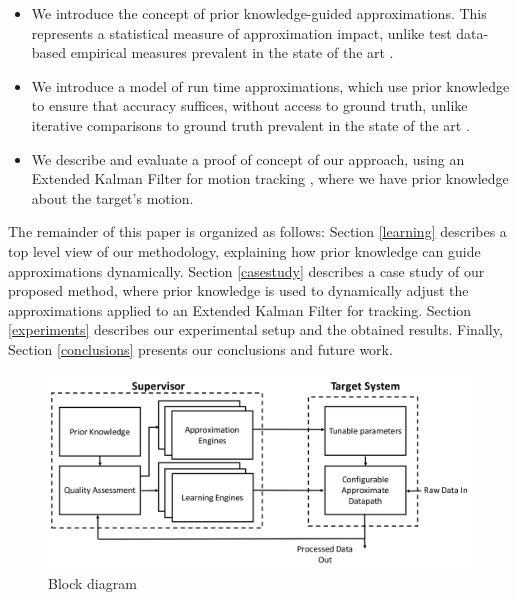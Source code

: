\begin{itemize}
\item	We introduce the concept of prior knowledge-guided approximations. This represents a statistical measure of approximation impact, unlike test data-based empirical measures prevalent in the state of the art \cite{zhang2014approxit}.
\item	We introduce a model of run time approximations, which use prior knowledge to ensure that accuracy suffices, without access to ground truth, unlike iterative comparisons to ground truth prevalent in the state of the art \cite{han2013approximate}.
\item 	We describe and evaluate a proof of concept of our approach, using an Extended Kalman Filter for motion tracking \cite{kulikov2016accurate}, where we have prior knowledge about the target's motion. 
\end{itemize}

\par The remainder of this paper is organized as follows: Section \ref{learning} describes a top level view of our methodology, explaining how prior knowledge can guide approximations dynamically. Section \ref{casestudy} describes a case study of our proposed method, where prior knowledge is used to dynamically adjust the approximations applied to an Extended Kalman Filter for tracking. Section \ref{experiments} describes our experimental setup and the obtained results. Finally, Section \ref{conclusions} presents our conclusions and future work. 


\begin{figure}[tb]
  \centering
  \includegraphics[width=\columnwidth]{img/block_diagram.png}
  \caption{Block diagram}
  \label{fig:block_diagram}
\end{figure}
